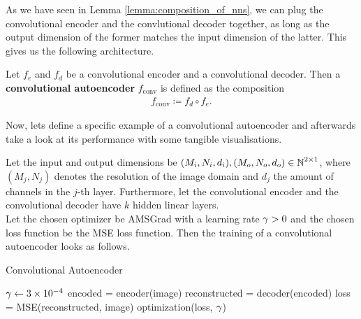 As we have seen in Lemma \ref{lemma:composition_of_nns}, we can plug the convolutional encoder and the convlutional decoder together, as long as the output dimension of the former matches the input dimension of the latter. This gives us the following architecture.

\begin{definition}
Let $f_e$ and $f_d$ be a convolutional encoder and a convolutional decoder. Then a \textbf{convolutional autoencoder} $f_{\text{conv}}$ is defined as the composition
\begin{align*}
f_{\text{conv}} \coloneqq f_d \circ f_e.
\end{align*}
\end{definition}

Now, lets define a specific example of a convolutional autoencoder and afterwards take a look at its performance with some tangible visualisations.

\begin{algorithm}
Let the input and output dimensions be $(M_i,N_i, d_i), (M_o,N_o,d_o) \in \operatorname{\mathbb{N}}^{2\times 1}$, where $(M_j, N_j)$ denotes the resolution of the image domain and $d_j$ the amount of channels in the $j$-th layer. Furthermore, let the convolutional encoder and the convolutional decoder have $k$ hidden linear layers.\\
Let the chosen optimizer be AMSGrad with a learning rate $\operatorname{\gamma}>0$ and the chosen loss function be the MSE loss function. Then the training of a convolutional autoencoder looks as follows.
\caption{Convolutional Autoencoder}\label{alg:convolutional_AE}
\begin{algorithmic}[1]
\Require $\operatorname{\gamma} \gets \num{3e-4}$
	    \State encoded = encoder(image) 
		\State reconstructed = decoder(encoded) 
    	\State loss = MSE(reconstructed, image) 
	    \State optimization(loss, $\operatorname{\gamma}$) 
    \EndFor
\EndFor
\end{algorithmic}
\end{algorithm}

